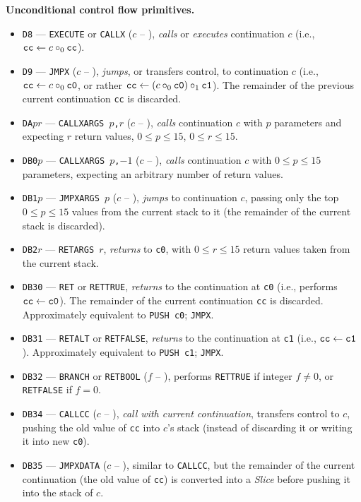 \documentclass[12pt,oneside]{article}
\def\makepoint#1{\medbreak\noindent{\bf #1.\ }}
\def\nxsubpoint{\refstepcounter{subsubsection}%
    \smallbreak\makepoint{\thesubsubsection}}
\def\emb#1{\textbf{#1.}}
\begin{document}
\nxsubpoint\emb{Unconditional control flow primitives}
\begin{itemize}
\item {\tt D8} --- {\tt EXECUTE} or {\tt CALLX} ($c$ -- ), {\em calls\/} or {\em executes\/} continuation $c$ (i.e., ${\tt cc}\leftarrow c\circ_0{\tt cc}$).
\item {\tt D9} --- {\tt JMPX} ($c$ -- ), {\em jumps\/}, or transfers control, to continuation $c$ (i.e., ${\tt cc}\leftarrow c\circ_0{\tt c0}$, or rather ${\tt cc}\leftarrow(c\circ_0{\tt c0})\circ_1{\tt c1}$). The remainder of the previous current continuation {\tt cc} is discarded.
\item {\tt DA$pr$} --- {\tt CALLXARGS $p$,$r$} ($c$ -- ), {\em calls\/} continuation $c$ with $p$ parameters and expecting $r$ return values, $0\leq p\leq15$, $0\leq r\leq 15$.
\item {\tt DB0$p$} --- {\tt CALLXARGS $p$,$-1$} ($c$ -- ), {\em calls\/} continuation $c$ with $0\leq p\leq15$ parameters, expecting an arbitrary number of return values.
\item {\tt DB1$p$} --- {\tt JMPXARGS $p$} ($c$ -- ), {\em jumps\/} to continuation $c$, passing only the top $0\leq p\leq 15$ values from the current stack to it (the remainder of the current stack is discarded).
\item {\tt DB2$r$} --- {\tt RETARGS $r$}, {\em returns} to {\tt c0}, with $0\leq r\leq 15$ return values taken from the current stack.
\item {\tt DB30} --- {\tt RET} or {\tt RETTRUE}, {\em returns} to the continuation at {\tt c0} (i.e., performs ${\tt cc}\leftarrow{\tt c0}$). The remainder of the current continuation {\tt cc} is discarded. Approximately equivalent to {\tt PUSH c0}; {\tt JMPX}.
\item {\tt DB31} --- {\tt RETALT} or {\tt RETFALSE}, {\em returns} to the continuation at {\tt c1} (i.e., ${\tt cc}\leftarrow{\tt c1}$). Approximately equivalent to {\tt PUSH c1}; {\tt JMPX}.
\item {\tt DB32} --- {\tt BRANCH} or {\tt RETBOOL} ($f$ -- ), performs {\tt RETTRUE} if integer $f\neq 0$, or {\tt RETFALSE} if $f=0$.
\item {\tt DB34} --- {\tt CALLCC} ($c$ -- ), {\em call with current continuation}, transfers control to $c$, pushing the old value of {\tt cc} into $c$'s stack (instead of discarding it or writing it into new {\tt c0}).
\item {\tt DB35} --- {\tt JMPXDATA} ($c$ -- ), similar to {\tt CALLCC}, but the remainder of the current continuation (the old value of {\tt cc}) is converted into a {\em Slice\/} before pushing it into the stack of $c$.

\end{itemize}
\end{document}
